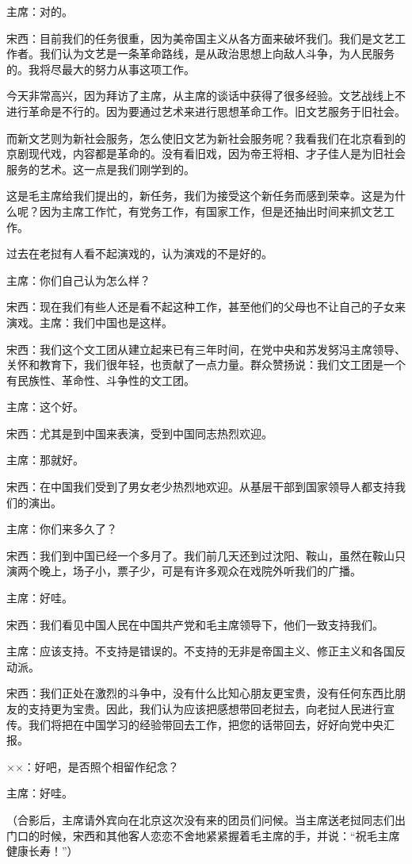主席：对的。

宋西：目前我们的任务很重，因为美帝国主义从各方面来破坏我们。我们是文艺工作者。我们认为文艺是一条革命路线，是从政治思想上向敌人斗争，为人民服务的。我将尽最大的努力从事这项工作。

今天非常高兴，因为拜访了主席，从主席的谈话中获得了很多经验。文艺战线上不进行革命是不行的。因为要通过艺术来进行思想革命工作。旧文艺服务于旧社会。

而新文艺则为新社会服务，怎么使旧文艺为新社会服务呢？我看我们在北京看到的京剧现代戏，内容都是革命的。没有看旧戏，因为帝王将相、才子佳人是为旧社会服务的艺术。这一点是我们刚学到的。

这是毛主席给我们提出的，新任务，我们为接受这个新任务而感到荣幸。这是为什么呢？因为主席工作忙，有党务工作，有国家工作，但是还抽出时间来抓文艺工作。

过去在老挝有人看不起演戏的，认为演戏的不是好的。

主席：你们自己认为怎么样？

宋西：现在我们有些人还是看不起这种工作，甚至他们的父母也不让自己的子女来演戏。主席：我们中国也是这样。

宋西：我们这个文工团从建立起来已有三年时间，在党中央和苏发努冯主席领导、关怀和教育下，我们很年轻，也贡献了一点力量。群众赞扬说：我们文工团是一个有民族性、革命性、斗争性的文工团。

主席：这个好。

宋西：尤其是到中国来表演，受到中国同志热烈欢迎。

主席：那就好。

宋西：在中国我们受到了男女老少热烈地欢迎。从基层干部到国家领导人都支持我们的演出。

主席：你们来多久了？

宋西：我们到中国已经一个多月了。我们前几天还到过沈阳、鞍山，虽然在鞍山只演两个晚上，场子小，票子少，可是有许多观众在戏院外听我们的广播。

主席：好哇。

宋西：我们看见中国人民在中国共产党和毛主席领导下，他们一致支持我们。

主席：应该支持。不支持是错误的。不支持的无非是帝国主义、修正主义和各国反动派。

宋西：我们正处在激烈的斗争中，没有什么比知心朋友更宝贵，没有任何东西比朋友的支持更为宝贵。因此，我们认为应该把感想带回老挝去，向老挝人民进行宣传。我们将把在中国学习的经验带回去工作，把您的话带回去，好好向党中央汇报。

××：好吧，是否照个相留作纪念？

主席：好哇。

（合影后，主席请外宾向在北京这次没有来的团员们问候。当主席送老挝同志们出门口的时候，宋西和其他客人恋恋不舍地紧紧握着毛主席的手，并说：“祝毛主席健康长寿！”）


